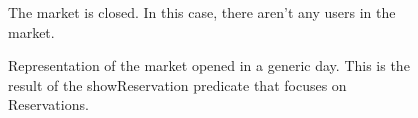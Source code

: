 \begin{figure}[H]

  \centering
   \caption{The market is closed. In this case, there aren't any users in the market.}
  \label{marketClosed}

   
\end{figure}

\begin{figure}[H]
  
  \centering
   \caption{Representation of the market opened in a generic day. This is the result of the showReservation predicate that focuses on Reservations.} 
     \label{shorReserv}

\end{figure}

